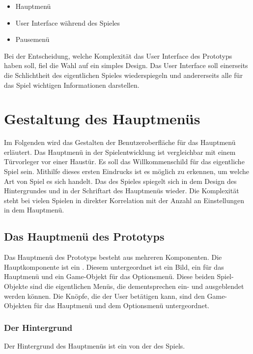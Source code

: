 \begin{itemize}
    \item Hauptmenü
    \item User Interface während des Spieles
    \item Pausemenü
\end{itemize}

\noindent
Bei der Entscheidung, welche Komplexität das User Interface des Prototyps haben soll, fiel die Wahl auf ein simples Design. 
Das User Interface soll einerseits die Schlichtheit des eigentlichen Spieles wiederspiegeln und andererseits alle für das Spiel wichtigen Informationen darstellen.

\section{Gestaltung des Hauptmenüs}

Im Folgenden wird das Gestalten der Benutzeroberfläche für das Hauptmenü erläutert. 
Das Hauptmenü in der Spielentwicklung ist vergleichbar mit einem Türvorleger vor einer Haustür. Es soll das Willkommenschild für das eigentliche Spiel sein. 
Mithilfe dieses ersten Eindrucks ist es möglich zu erkennen, um welche Art von Spiel es sich handelt. Das  des Spieles spiegelt sich in dem Design des Hintergrundes und in der Schriftart des Hauptmenüs wieder. Die Komplexität steht bei vielen Spielen in direkter Korrelation mit der Anzahl an Einstellungen in dem Hauptmenü.

\pagebreak

\subsection{Das Hauptmenü des Prototyps}

Das Hauptmenü des Prototyps besteht aus mehreren Komponenten. Die Hauptkomponente ist ein . Diesem untergeordnet ist ein Bild, ein  für das Hauptmenü und ein Game-Objekt für das Optionsmenü. Diese beiden Spiel-Objekte sind die eigentlichen Menüs, die dementsprechen ein- und ausgeblendet werden können. Die Knöpfe, die der User betätigen kann, sind den Game-Objekten für das Hauptmenü und dem Optionsmenü untergeordnet. 

\subsubsection{Der Hintergrund}
Der Hintergrund des Hauptmenüs ist ein  von der  des Spiels. 
